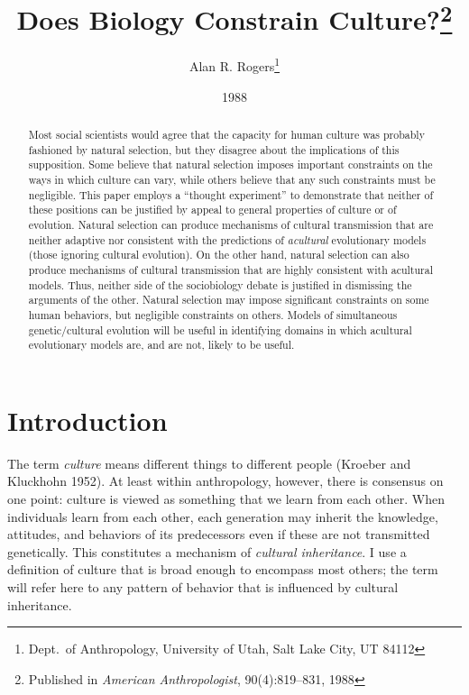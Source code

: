 \documentclass[11pt]{article}
\date{1988}
\begin{document}
\title{Does Biology Constrain Culture?\thanks{Published in 
\emph{American Anthropologist}, 90(4):819--831, 1988}}
\author{Alan R. Rogers\thanks{Dept.\ of Anthropology, University of
    Utah, Salt Lake City, UT 84112}}
\maketitle
\begin{abstract}
Most social scientists would agree that the capacity for human culture was
probably fashioned by natural selection, but they disagree about the
implications of this supposition.  Some believe that natural selection
imposes important constraints on the ways in which culture can vary, while
others believe that any such constraints must be negligible.  This paper
employs a ``thought experiment'' to demonstrate that neither of these
positions can be justified by appeal to general properties of culture or
of evolution.  Natural selection can produce mechanisms of cultural
transmission that are neither adaptive nor consistent with the predictions
of \emph{acultural} evolutionary models (those ignoring cultural
evolution).  On the other hand, natural selection can also produce
mechanisms of cultural transmission that are highly consistent with
acultural models.  Thus, neither side of the sociobiology debate is
justified in dismissing the arguments of the other.  Natural selection may
impose significant constraints on some human behaviors, but negligible
constraints on others.  Models of simultaneous genetic/cultural evolution
will be useful in identifying domains in which acultural evolutionary
models are, and are not, likely to be useful. 
\end{abstract}

\section{Introduction}

The term \emph{culture} means different things to different people
(Kroeber and Kluckhohn 1952).  At least within anthropology, however,
there is consensus on one point: culture is viewed as something that we
learn from each other. When individuals learn from each other, each
generation may inherit the knowledge, attitudes, and behaviors of its
predecessors even if these are not transmitted genetically.  This
constitutes a mechanism of \emph{cultural inheritance}.  I use a definition
of culture that is broad enough to encompass most others; the term will
refer here to any pattern of behavior that is influenced by cultural
inheritance. 
\end{document}
